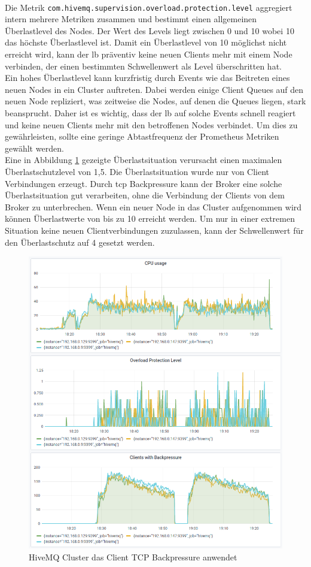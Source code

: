 \\
Die Metrik \verb|com.hivemq.supervision.overload.protection.level| aggregiert intern mehrere Metriken zusammen und bestimmt einen allgemeinen Überlastlevel des Nodes. Der Wert des Levels liegt zwischen 0 und 10 wobei 10 das höchste Überlastlevel ist.
Damit ein Überlastlevel von 10 möglichst nicht erreicht wird, kann der \acl{lb} präventiv keine neuen Clients mehr mit einem Node verbinden, der einen bestimmten Schwellenwert als Level überschritten hat.
\\
Ein hohes Überlastlevel kann kurzfristig durch Events wie das Beitreten eines neuen Nodes in ein Cluster auftreten. Dabei werden einige Client Queues auf den neuen Node repliziert, was zeitweise die Nodes, auf denen die Queues liegen, stark beansprucht. Daher ist es wichtig, dass der \ac{lb} auf solche Events schnell reagiert und keine neuen Clients mehr mit den betroffenen Nodes verbindet.
Um dies zu gewährleisten, sollte eine geringe Abtastfrequenz der Prometheus Metriken gewählt werden.
\\
Eine in Abbildung \ref{fig:overload-protection} gezeigte Überlastsituation verursacht einen maximalen Überlastschutzlevel von 1,5.
Die Überlastsituation wurde nur von Client Verbindungen erzeugt. Durch \ac{tcp} Backpressure kann der Broker eine solche Überlastsituation gut verarbeiten, ohne die Verbindung der Clients von dem Broker zu unterbrechen. Wenn ein neuer Node in das Cluster aufgenommen wird können Überlastwerte von bis zu 10 erreicht werden. Um nur in einer extremen Situation keine neuen Clientverbindungen zuzulassen, kann der Schwellenwert für den Überlastschutz auf 4 gesetzt werden.
\\
\begin{figure}
    \centering
    \includegraphics[scale=0.8]{images/overload-protection.png}
    \caption{HiveMQ Cluster das Client TCP Backpressure anwendet}
    \label{fig:overload-protection}
\end{figure}
